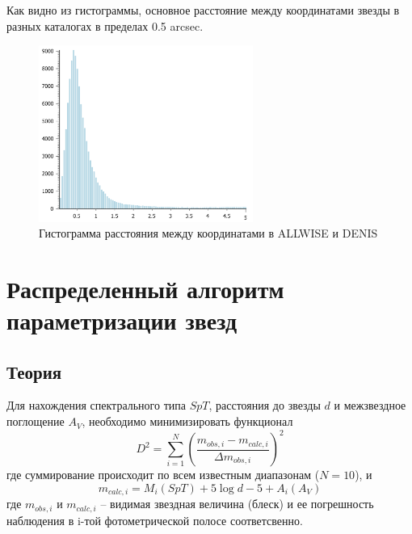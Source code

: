 \documentclass[12pt, a4paper]{article}
\begin{document}
	Как видно из гистограммы, основное расстояние между координатами звезды в разных каталогах в пределах 0.5 arcsec.
	
	\begin{figure}[h]
	\centering
	\includegraphics[width=7cm]{lol}
	\caption{Гистограмма расстояния между координатами в ALLWISE и DENIS}
	\end{figure}
	\section{Распределенный алгоритм параметризации звезд}
	\subsection*{Теория}
	Для нахождения спектрального типа $SpT$, расстояния до звезды $d$ и межзвездное поглощение $A_V$, необходимо минимизировать функционал
	$$
	D^2 = \sum_{i=1}^N \left(\frac{m_{obs,i}-m_{calc,i}}{\Delta m_{obs,i}} \right)^2
	$$
	где суммирование происходит по всем известным диапазонам ($N = 10$), и
	$$
	m_{calc,i} = M_i(SpT) + 5 \log d - 5 + A_i(A_V)
	$$
	где $m_{obs,i}$ и $m_{calc,i}$ -- видимая звездная величина (блеск) и ее погрешность наблюдения в i-той фотометрической полосе соответсвенно.
\end{document}
